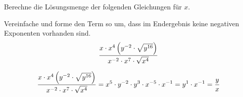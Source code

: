 \documentclass[12pt]{exam}
\begin{document}
\newpage
\begin{questions}
\question[3]
Berechne die Lösungsmenge der folgenden Gleichungen für $x$.
{\begin{solution}
\end{solution}}
{\vspace{5pt}\vfill}

\question[2]
Vereinfache und forme den Term so um, dass im Endergebnis keine negativen Exponenten vorhanden sind.
\[\frac{x\cdot x^4\left(y^{-2}\cdot\sqrt{y^{16}}\right)}{x^{-2}\cdot x^7\cdot\sqrt{x^4}}\]
{\begin{solution}
	\[\frac{x\cdot x^4\left(y^{-2}\cdot\sqrt{y^{16}}\right)}{x^{-2}\cdot x^7\cdot\sqrt{x^4}}=x^5\cdot y^{-2}\cdot y^3\cdot x^{-5}\cdot x^{-1}=y^1\cdot x^{-1}=\frac{y}{x}\]
\end{solution}}
{\vspace{5pt}\newpage}



\end{questions}
\end{document}
